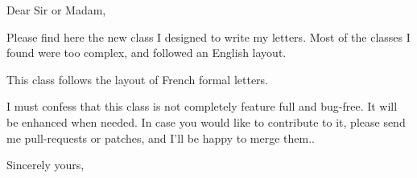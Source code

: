 \documentclass[12pt]{frenchletter}
\date{\today}
\begin{document}
    \opening{Dear Sir or Madam,}

    Please find here the new class I designed to write my letters. Most of the classes I found were too complex, and followed an English layout.

    This class follows the layout of French formal letters.

    I must confess that this class is not completely feature full and bug-free. It will be enhanced when needed. In case you would like to contribute to it, please send me pull-requests or patches, and I'll be happy to merge them..

    \closing{Sincerely yours,}
\end{document}
